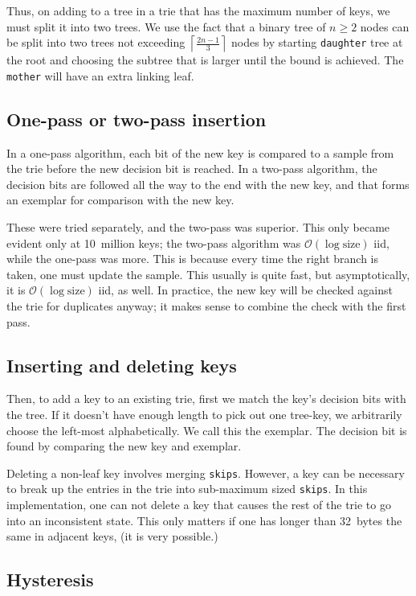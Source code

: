 \documentclass[14pt]{article}
\newcommand{\code}[1]{\colorbox{light-gray}{\texttt{#1}}}
\begin{document}
Thus, on adding to a tree in a trie that has the maximum number of keys, we must split it into two trees. We use the fact that a binary tree of $n \ge 2$ nodes can be split into two trees not exceeding $\left\lceil \frac{2n-1}{3} \right\rceil$ nodes by starting \code{daughter} tree at the root and choosing the subtree that is larger until the bound is achieved. The \code{mother} will have an extra linking leaf.

\subsection{One-pass or two-pass insertion}

In a one-pass algorithm, each bit of the new key is compared to a sample from the trie before the new decision bit is reached. In a two-pass algorithm, the decision bits are followed all the way to the end with the new key, and that forms an exemplar for comparison with the new key.

These were tried separately, and the two-pass was superior. This only became evident only at 10~million keys; the two-pass algorithm was $\mathcal{O}(\log \text{size})$ iid, while the one-pass was more. This is because every time the right branch is taken, one must update the sample. This usually is quite fast, but asymptotically, it is $\mathcal{O}(\log \text{size})$ iid, as well. In practice, the new key will be checked against the trie for duplicates anyway; it makes sense to combine the check with the first pass.

\subsection{Inserting and deleting keys}

Then, to add a key to an existing trie, first we match the key's decision bits with the tree. If it doesn't have enough length to pick out one tree-key, we arbitrarily choose the left-most alphabetically. We call this the exemplar. The decision bit is found by comparing the new key and exemplar.

Deleting a non-leaf key involves merging \code{skips}. However, a key can be necessary to break up the entries in the trie into sub-maximum sized \code{skips}. In this implementation, one can not delete a key that causes the rest of the trie to go into an inconsistent state. This only matters if one has longer than 32~bytes the same in adjacent keys, (it is very possible.)

\subsection{Hysteresis}
\end{document}
